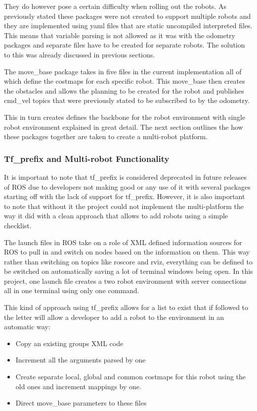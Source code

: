 \documentclass{report}
\begin{document}
        They do however pose a certain difficulty when rolling out the robots. As previously stated these packages were not created to support multiple robots and they are implemented using yaml files that are static uncompiled interpreted files. This means that variable parsing is not allowed as it was with the odometry packages and separate files have to be created for separate robots. The solution to this was already discussed in previous sections.

        The move\_base package takes in five files in the current implementation all of which define the costmaps for each specific robot. This move\_base then creates the obstacles and allows the planning to be created for the robot and publishes cmd\_vel topics that were previously stated to be subscribed to by the odometry.

        This in turn creates defines the backbone for the robot environment with single robot environment explained in great detail. The next section outlines the how these packages together are taken to create a multi-robot platform.

      \subsubsection{Tf\_prefix and Multi-robot Functionality}
        It is important to note that tf\_prefix is considered deprecated in future releases of ROS due to developers not making good or any use of it with several packages starting off with the lack of support for tf\_prefix. However, it is also important to note that without it the project could not implement the multi-platform the way it did with a clean approach that allows to add robots using a simple checklist.

        The launch files in ROS take on a role of XML defined information sources for ROS to pull in and switch on nodes based on the information on them. This way rather than switching on topics like roscore and rviz, everything can be defined to be switched on automatically saving a lot of terminal windows being open. In this project, one launch file creates a two robot environment with server connections all in one terminal using only one command.

        This kind of approach using tf\_prefix allows for a list to exist that if followed to the letter will allow a developer to add a robot to the environment in an automatic way:
          \begin{itemize}
            \item Copy an existing groups XML code
            \item Increment all the arguments parsed by one
            \item Create separate local, global and common costmaps for this robot using the old ones and increment mappings by one.
            \item Direct move\_base parameters to these files
          \end{itemize}
\end{document}
